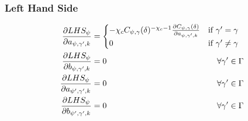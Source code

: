 \documentclass[11pt]{article}
\begin{document}
\subsubsection*{Left Hand Side}
\begin{align}
\frac{\partial LHS_{\psi}}{\partial a_{\psi,\gamma',k}} &=
\begin{cases}
-\chi_cC_{\psi,\gamma}(\delta)^{-\chi_c-1}\frac{\partial C_{\psi,\gamma}(\delta)}{\partial a_{\psi,\gamma',k}} & \text{if } \gamma' = \gamma \\
0 & \text{if } \gamma' \neq \gamma
\end{cases}\\
\frac{\partial LHS_{\psi}}{\partial b_{\psi,\gamma',k}} &= 0 \hspace{4.75cm} \forall \gamma'\in\Gamma\\
\frac{\partial LHS_{\psi}}{\partial a_{\psi',\gamma',k}} &= 0 \hspace{4.75cm} \forall \gamma'\in\Gamma\\
\frac{\partial LHS_{\psi}}{\partial b_{\psi',\gamma',k}} &= 0 \hspace{4.75cm} \forall \gamma'\in\Gamma
\end{align}
\end{document}
